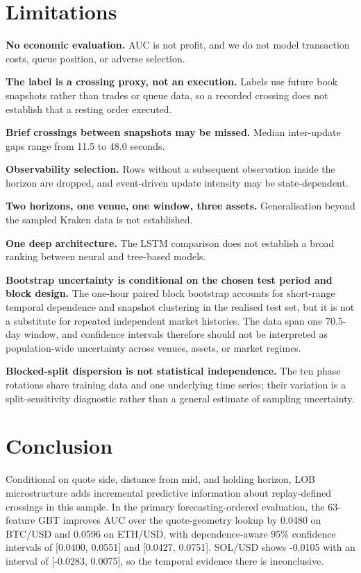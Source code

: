 \documentclass[11pt]{article}
\begin{document}
\section{Limitations}
\textbf{No economic evaluation.} AUC is not profit, and we do not model transaction costs, queue position, or adverse selection.

\textbf{The label is a crossing proxy, not an execution.} Labels use future book snapshots rather than trades or queue data, so a recorded crossing does not establish that a resting order executed.

\textbf{Brief crossings between snapshots may be missed.} Median inter-update gaps range from 11.5 to 48.0 seconds.

\textbf{Observability selection.} Rows without a subsequent observation inside the horizon are dropped, and event-driven update intensity may be state-dependent.

\textbf{Two horizons, one venue, one window, three assets.} Generalisation beyond the sampled Kraken data is not established.

\textbf{One deep architecture.} The LSTM comparison does not establish a broad ranking between neural and tree-based models.

\textbf{Bootstrap uncertainty is conditional on the chosen test period and block design.} The one-hour paired block bootstrap accounts for short-range temporal dependence and snapshot clustering in the realised test set, but it is not a substitute for repeated independent market histories. The data span one 70.5-day window, and confidence intervals therefore should not be interpreted as population-wide uncertainty across venues, assets, or market regimes.

\textbf{Blocked-split dispersion is not statistical independence.} The ten phase rotations share training data and one underlying time series; their variation is a split-sensitivity diagnostic rather than a general estimate of sampling uncertainty.

\section{Conclusion}
Conditional on quote side, distance from mid, and holding horizon, LOB microstructure adds incremental predictive information about replay-defined crossings in this sample. In the primary forecasting-ordered evaluation, the 63-feature GBT improves AUC over the quote-geometry lookup by 0.0480 on BTC/USD and 0.0596 on ETH/USD, with dependence-aware 95\% confidence intervals of [0.0400, 0.0551] and [0.0427, 0.0751]. SOL/USD shows -0.0105 with an interval of [-0.0283, 0.0075], so the temporal evidence there is inconclusive.
\end{document}
